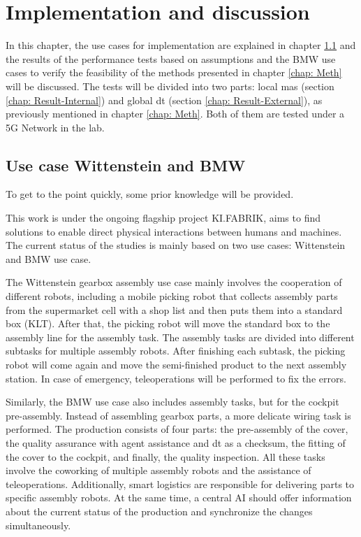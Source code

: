 \chapter{Implementation and discussion} \label{chap: Result}

In this chapter, the use cases for implementation are explained 
in chapter \ref{chap: Usecase} and the results of the performance 
tests based on assumptions 
and the BMW use cases to verify the feasibility of the methods presented 
in chapter \ref{chap: Meth} will be discussed. The tests will be divided into 
two parts: local \gls{mas} (section \ref{chap: Result-Internal}) and 
global \gls{dt} (section \ref{chap: Result-External}), as previously mentioned in 
chapter \ref{chap: Meth}. Both of them are tested under a 5G Network in the lab.

\section{Use case Wittenstein and BMW}\label{chap: Usecase}
To get to the point quickly, some prior knowledge will be provided. 

This work is under the ongoing flagship project KI.FABRIK, aims to 
find solutions to enable direct physical interactions between humans and 
machines. The current status of the studies is mainly based on two use 
cases: Wittenstein and BMW use case. 

The Wittenstein gearbox assembly use case mainly involves the cooperation of different 
robots, including a mobile picking robot that collects assembly parts from 
the supermarket cell with a shop list and then puts them into a standard box (KLT). 
After that, the picking robot will move the standard box to the assembly line for 
the assembly task. The assembly tasks are divided into different subtasks for 
multiple assembly robots. After finishing each subtask, the picking robot 
will come again and move the semi-finished product to the next assembly station. 
In case of emergency, teleoperations will be performed to fix the 
errors. 

Similarly, the BMW use case also includes assembly tasks, but for the cockpit 
pre-assembly. Instead of assembling gearbox parts, a more delicate wiring task 
is performed. The production consists of four parts: the pre-assembly of the cover, 
the quality assurance with agent 
assistance and \gls{dt} as a checksum, the fitting of the cover to the cockpit, and 
finally, the quality inspection. All these tasks involve the coworking of 
multiple assembly robots and the assistance of teleoperations. Additionally, 
smart logistics are responsible for delivering parts to 
specific assembly robots. At the same time, a central AI should offer information about the current status of 
the production and synchronize the changes simultaneously. 


